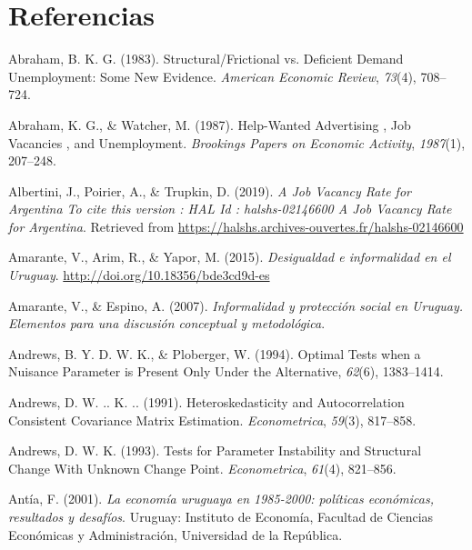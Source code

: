 \documentclass[12pt,oneside]{reedthesis}
\begin{document}

\noindent
\setlength{\parindent}{-0.20in}
\setlength{\leftskip}{0.20in}
\setlength{\parskip}{8pt}

\hypertarget{referencias}{%
\chapter*{Referencias}\label{referencias}}

\hypertarget{refs}{}
\leavevmode\hypertarget{ref-Abraham1983}{}%
Abraham, B. K. G. (1983). Structural/Frictional vs. Deficient Demand Unemployment: Some New Evidence. \emph{American Economic Review}, \emph{73}(4), 708--724.

\leavevmode\hypertarget{ref-Abraham1987}{}%
Abraham, K. G., \& Watcher, M. (1987). Help-Wanted Advertising , Job Vacancies , and Unemployment. \emph{Brookings Papers on Economic Activity}, \emph{1987}(1), 207--248.

\leavevmode\hypertarget{ref-ArgentinaBC2019}{}%
Albertini, J., Poirier, A., \& Trupkin, D. (2019). \emph{A Job Vacancy Rate for Argentina To cite this version : HAL Id : halshs-02146600 A Job Vacancy Rate for Argentina}. Retrieved from \url{https://halshs.archives-ouvertes.fr/halshs-02146600}

\leavevmode\hypertarget{ref-Amarante2015}{}%
Amarante, V., Arim, R., \& Yapor, M. (2015). \emph{Desigualdad e informalidad en el Uruguay}. \url{http://doi.org/10.18356/bde3cd9d-es}

\leavevmode\hypertarget{ref-Amarante2007}{}%
Amarante, V., \& Espino, A. (2007). \emph{Informalidad y protección social en Uruguay. Elementos para una discusión conceptual y metodológica}.

\leavevmode\hypertarget{ref-Andrews1994}{}%
Andrews, B. Y. D. W. K., \& Ploberger, W. (1994). Optimal Tests when a Nuisance Parameter is Present Only Under the Alternative, \emph{62}(6), 1383--1414.

\leavevmode\hypertarget{ref-Andrews1991}{}%
Andrews, D. W. .. K. .. (1991). Heteroskedasticity and Autocorrelation Consistent Covariance Matrix Estimation. \emph{Econometrica}, \emph{59}(3), 817--858.

\leavevmode\hypertarget{ref-Andrews1993}{}%
Andrews, D. W. K. (1993). Tests for Parameter Instability and Structural Change With Unknown Change Point. \emph{Econometrica}, \emph{61}(4), 821--856.

\leavevmode\hypertarget{ref-Antia2001}{}%
Antía, F. (2001). \emph{La economía uruguaya en 1985-2000: políticas económicas, resultados y desafíos}. Uruguay: Instituto de Economía, Facultad de Ciencias Económicas y Administración, Universidad de la República.
\end{document}
